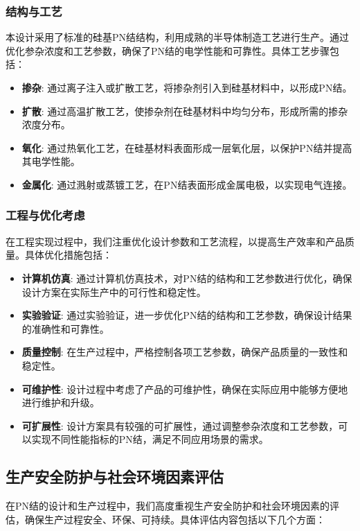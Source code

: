\documentclass[12pt,hyperref,a4paper,UTF8]{ctexart}
\begin{document}
\subsubsection*{结构与工艺}
本设计采用了标准的硅基PN结结构，利用成熟的半导体制造工艺进行生产。通过优化参杂浓度和工艺参数，确保了PN结的电学性能和可靠性。具体工艺步骤包括：

\begin{itemize}
    \item \textbf{掺杂}: 通过离子注入或扩散工艺，将掺杂剂引入到硅基材料中，以形成PN结。
    \item \textbf{扩散}: 通过高温扩散工艺，使掺杂剂在硅基材料中均匀分布，形成所需的掺杂浓度分布。
    \item \textbf{氧化}: 通过热氧化工艺，在硅基材料表面形成一层氧化层，以保护PN结并提高其电学性能。
    \item \textbf{金属化}: 通过溅射或蒸镀工艺，在PN结表面形成金属电极，以实现电气连接。
\end{itemize}

\subsubsection*{工程与优化考虑}
在工程实现过程中，我们注重优化设计参数和工艺流程，以提高生产效率和产品质量。具体优化措施包括：

\begin{itemize}
    \item \textbf{计算机仿真}: 通过计算机仿真技术，对PN结的结构和工艺参数进行优化，确保设计方案在实际生产中的可行性和稳定性。
    \item \textbf{实验验证}: 通过实验验证，进一步优化PN结的结构和工艺参数，确保设计结果的准确性和可靠性。
    \item \textbf{质量控制}: 在生产过程中，严格控制各项工艺参数，确保产品质量的一致性和稳定性。
    \item \textbf{可维护性}: 设计过程中考虑了产品的可维护性，确保在实际应用中能够方便地进行维护和升级。
    \item \textbf{可扩展性}: 设计方案具有较强的可扩展性，通过调整参杂浓度和工艺参数，可以实现不同性能指标的PN结，满足不同应用场景的需求。
\end{itemize}

\subsection{生产安全防护与社会环境因素评估}

在PN结的设计和生产过程中，我们高度重视生产安全防护和社会环境因素的评估，确保生产过程安全、环保、可持续。具体评估内容包括以下几个方面：
\end{document}
